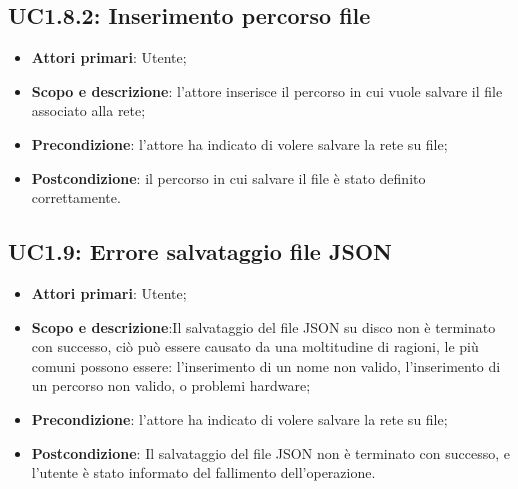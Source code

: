 \subsection{UC1.8.2: Inserimento percorso file} 
\hypertarget{UC1.8.2}{} 
\begin{itemize} 
	\item{\textbf{Attori primari}: Utente;} 
	\item{\textbf{Scopo e descrizione}: l'attore inserisce il percorso in cui vuole salvare il file associato alla rete;} 
	\item{\textbf{Precondizione}: l'attore ha indicato di volere salvare la rete su file;} 
	\item{\textbf{Postcondizione}: il percorso in cui salvare il file è stato definito correttamente.}
\end{itemize} 
\subsection{UC1.9: Errore salvataggio file JSON} 
\hypertarget{UC1.9}{} 
\begin{itemize} 
	\item{\textbf{Attori primari}: Utente;} 
	\item{\textbf{Scopo e descrizione}:Il salvataggio del file JSON su disco non è terminato con successo, ciò può essere causato da una moltitudine di ragioni, le più comuni possono essere: l'inserimento di un nome non valido, l'inserimento di un percorso non valido, o problemi hardware;} 
	\item{\textbf{Precondizione}: l'attore ha indicato di volere salvare la rete su file;} 
	\item{\textbf{Postcondizione}: Il salvataggio del file JSON non è terminato con successo, e l'utente è stato informato del fallimento dell'operazione.} 
\end{itemize}
